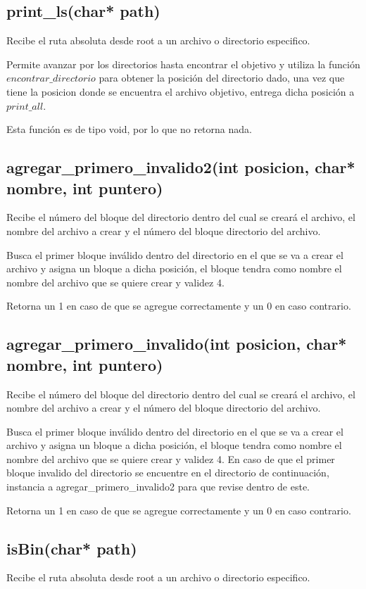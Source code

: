 \documentclass[12pt]{article}
\begin{document}
\subsection{print\_ls(char* path)}
Recibe el ruta absoluta desde root a un archivo o directorio especifico.

Permite avanzar por los directorios hasta encontrar el objetivo y utiliza la función $encontrar\_directorio$ para obtener la posición del directorio dado, una vez que tiene la posicion donde se encuentra el archivo objetivo, entrega dicha posición a $print\_all$.

Esta función es de tipo void, por lo que no retorna nada.

\subsection{agregar\_primero\_invalido2(int posicion, char* nombre, int puntero)}
Recibe el número del bloque del directorio dentro del cual se creará el archivo, el nombre del archivo a crear y el número del bloque directorio del archivo.

Busca el primer bloque inválido dentro del directorio en el que se va a crear el archivo y asigna un bloque a dicha posición, el bloque tendra como nombre el nombre del archivo que se quiere crear y validez 4.

Retorna un 1 en caso de que se agregue correctamente y un 0 en caso contrario.


\subsection{agregar\_primero\_invalido(int posicion, char* nombre, int puntero)}
Recibe el número del bloque del directorio dentro del cual se creará el archivo, el nombre del archivo a crear y el número del bloque directorio del archivo.

Busca el primer bloque inválido dentro del directorio en el que se va a crear el archivo y asigna un bloque a dicha posición, el bloque tendra como nombre el nombre del archivo que se quiere crear y validez 4. En caso de que el primer bloque invalido del directorio se encuentre en el directorio de continuación, instancia a agregar\_primero\_invalido2 para que revise dentro de este.

Retorna un 1 en caso de que se agregue correctamente y un 0 en caso contrario.

\subsection{isBin(char* path)}
Recibe el ruta absoluta desde root a un archivo o directorio especifico.
\end{document}
